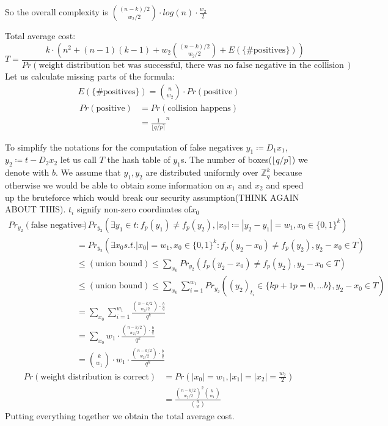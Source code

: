 \documentclass[12pt]{article}
\newcommand{\ZZ}{\mathbb{Z}}
\begin{document}
So the overall complexity is  $\binom{(n-k)/2}{w_2/2} \cdot log(n) \cdot \frac{w_2}{2}$

Total average cost:
\[
    T = \frac{k \cdot (n^2 + (n-1)(k-1) + w_2\binom{(n-k)/2}{w_2/2} + E(\{\text{\# positives}\}))}{Pr(\text{weight distribution bet was successful, there was no false negative in the collision search})}
\]
Let us calculate missing parts of the formula:
\[
\begin{split}
    E(\{\text{\#positives}\}) = \binom{n}{w_2} \cdot Pr(\text{positive})
\end{split}
\]
\[
\begin{split}
    Pr(\text{positive}) & = Pr(\text{collision happens}) \\
    & = \frac{1}{\lfloor q/p \rceil}^{n}
\end{split}
\]

To simplify the notations for the computation of false negatives $y_1 \coloneqq D_1x_1$, $y_2 \coloneqq t-D_2x_2$ let us call $T$ the hash table of $y_1$s. The number of boxes($\lfloor q/p \rceil$) we denote with $b$. We assume that $y_1, y_2$ are distributed uniformly over $\ZZ_q^{k}$ because otherwise we would be able to obtain some information on $x_1$ and $x_2$ and speed up the bruteforce which would break our security assumption(THINK AGAIN ABOUT THIS). $t_i$ signify non-zero coordinates of$x_0$
\[
\begin{split}
    Pr_{y_2}(\text{false negative}) & = Pr_{y_2}(\exists y_1 \in t: f_p(y_1) \neq f_p(y_2), |x_0| \coloneqq |y_2 - y_1| = w_1, x_0 \in \{0,1\}^{k}) \\
    & = Pr_{y_2}(\exists x_0 s.t. |x_0| = w_1, x_0 \in\{0,1\}^{k}: f_p(y_2 - x_0) \neq f_p(y_2), y_2 - x_0 \in T) \\
    & \leq (\text{union bound}) \leq \sum_{x_0} Pr_{y_2}(f_p(y_2 - x_0) \neq f_p(y_2), y_2 - x_0 \in T) \\
    & \leq (\text{union bound}) \leq \sum_{x_0} \sum_{i = 1}^{w_1} Pr_{y_2}((y_2)_{t_i} \in \{kp+1 p=0, \dots b\}, y_2 - x_0 \in T) \\
    & = \sum_{x_0} \sum_{i = 1}^{w_1} \frac{\binom{n-k/2}{w_2/2} \cdot \frac{b}{q}}{q^k} \\
    & = \sum_{x_0} w_1 \cdot \frac{\binom{n-k/2}{w_2/2} \cdot \frac{b}{q}}{q^k} \\
    & = \binom{k}{w_1} \cdot w_1 \cdot \frac{\binom{n-k/2}{w_2/2} \cdot \frac{b}{q}}{q^k}
\end{split}
\]
\[
\begin{split}
    Pr(\text{weight distribution is correct}) & = Pr(|x_0| = w_1, |x_1| = |x_2| = \frac{w_2}{2}) \\
    & = \frac{\binom{n-k/2}{w_2/2}^{2}\binom{k}{w_1}}{\binom{n}{w}}
\end{split}
\]
Putting everything together we obtain the total average cost.
\end{document}
